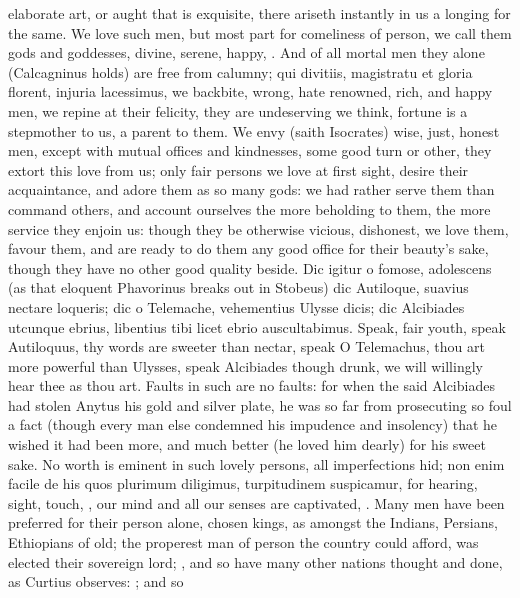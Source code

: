elaborate art, or aught that is exquisite, there ariseth instantly in
us a longing for the same. We love such men, but most part for
comeliness of person, we call them gods and goddesses, divine, serene,
happy, \etc{}. And of all mortal men they alone (Calcagninus holds)
are free from calumny; qui divitiis, magistratu et gloria florent,
injuria lacessimus, we backbite, wrong, hate renowned, rich, and happy
men, we repine at their felicity, they are undeserving we think,
fortune is a stepmother to us, a parent to them. We envy (saith
Isocrates) wise, just, honest men, except with mutual offices and
kindnesses, some good turn or other, they extort this love from us;
only fair persons we love at first sight, desire their acquaintance,
and adore them as so many gods: we had rather serve them than command
others, and account ourselves the more beholding to them, the more
service they enjoin us: though they be otherwise vicious, dishonest, we
love them, favour them, and are ready to do them any good office for
their beauty's sake, though they have no other good quality
beside. Dic igitur o fomose, adolescens (as that eloquent Phavorinus
breaks out in Stobeus) dic Autiloque, suavius nectare loqueris;
dic o Telemache, vehementius Ulysse dicis; dic Alcibiades utcunque
ebrius, libentius tibi licet ebrio auscultabimus. Speak, fair youth,
speak Autiloquus, thy words are sweeter than nectar, speak O
Telemachus, thou art more powerful than Ulysses, speak Alcibiades
though drunk, we will willingly hear thee as thou art. Faults in such
are no faults: for when the said Alcibiades had stolen Anytus his gold
and silver plate, he was so far from prosecuting so foul a fact (though
every man else condemned his impudence and insolency) that he wished it
had been more, and much better (he loved him dearly) for his sweet
sake. No worth is eminent in such lovely persons, all imperfections
hid; non enim facile de his quos plurimum diligimus, turpitudinem
suspicamur, for hearing, sight, touch, \etc{}, our mind and all our senses
are captivated, . Many men have been
preferred for their person alone, chosen kings, as amongst the Indians,
Persians, Ethiopians of old; the properest man of person the country
could afford, was elected their sovereign lord; , and so have many other nations thought
and done, as Curtius observes: ; and so
